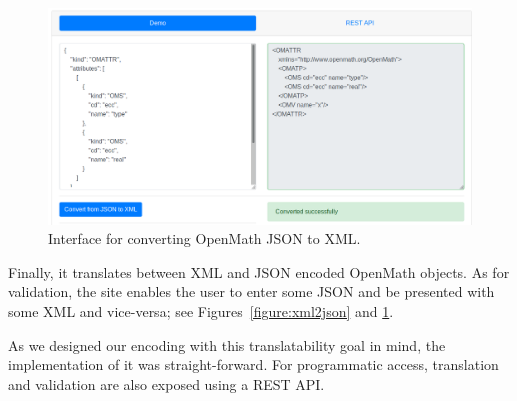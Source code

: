 \begin{figure}\centering
  \includegraphics[width=\textwidth]{images/json2xml}
  \caption{Interface for converting OpenMath JSON to XML.}\label{figure:json2xml}
\end{figure}

Finally, it translates between XML and JSON encoded OpenMath objects. 
As for validation, the site enables the user to enter some JSON and be presented with some XML and vice-versa; see Figures~\ref{figure:xml2json} and \ref{figure:json2xml}.

As we designed our encoding with this translatability goal in mind, the implementation of it was straight-forward. 
For programmatic access, translation and validation are also exposed using a REST API.



